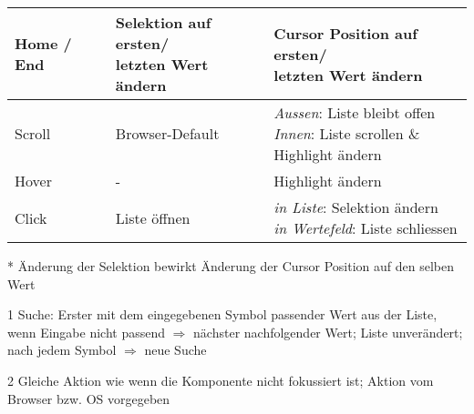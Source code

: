 \begin{table}[!htb]
\begin{adjustbox}{max width=\textwidth}
\begin{threeparttable}
\begin{tabular}{ l || l | l }
                \hline
                Home / End & \tbbr{Selektion auf ersten/ \\ 
                                   letzten Wert ändern}        & \tbbr{Cursor Position auf ersten/ \\ 
                                                                       letzten Wert ändern}                   \\
                \hline \hline
                Scroll     & Browser-Default\tnote{2}          & \tbbr{\emph{Aussen}: Liste bleibt offen \\
                                                                       \emph{Innen}: Liste scrollen \& \\ 
                                                                                     Highlight ändern}        \\
                \hline
                Hover      & -                                 & Highlight ändern                             \\
                \hline
                Click      & Liste öffnen                      & \tbbr{\emph{in Liste}: Selektion ändern \\
                                                                       \emph{in Wertefeld}: Liste schliessen} \\
                \hline
            \end{tabular}
            \begin{tablenotes}
                \scriptsize
                \item[*] Änderung der Selektion bewirkt Änderung der Cursor Position auf den selben Wert
                \item
                \item[1] Suche: Erster mit dem eingegebenen Symbol passender Wert aus der Liste, wenn Eingabe nicht passend $\Rightarrow$ nächster nachfolgender Wert; 
                                Liste unverändert; nach jedem Symbol $\Rightarrow$ neue Suche
                \item[2] Gleiche Aktion wie wenn die Komponente nicht fokussiert ist; Aktion vom Browser bzw. OS vorgegeben
            \end{tablenotes}
        \end{threeparttable}
    \end{adjustbox}
\end{table}
